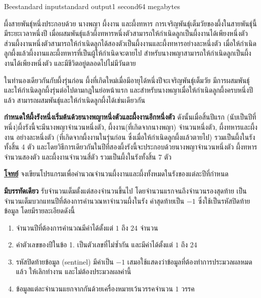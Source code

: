 \documentclass[11pt,a4paper]{article}
\begin{document}
\begin{problem}{Bee}{standard input}{standard output}{1 second}{64 megabytes}

ผึ้งสายพันธุ์หนึ่งประกอบด้วย นางพญา ผึ้งงาน และผึ้งทหาร การเจริญพันธุ์เต็มวัยของผึ้งในสายพันธุ์นี้ มีระยะเวลาหนึ่งปี เมื่อผสมพันธุ์แล้วผึ้งทหารหนึ่งตัวสามารถให้กำเนิดลูกเป็นผึ้งงานได้เพียงหนึ่งตัว ส่วนผึ้งงานหนึ่งตัวสามารถให้กำเนิดลูกได้สองตัวเป็นผึ้งงานและผึ้งทหารอย่างละหนึ่งตัว เมื่อให้กำเนิดลูกผึ้งแล้วผึ้งงานและผึ้งทหารที่เป็นผู้ให้กำเนิดจะตายไป สำหรับนางพญาสามารถให้กำเนิดลูกเป็นผึ้งงานได้เพียงหนึ่งตัว และมีชีวิตอยู่ตลอดไปไม่มีวันตาย

ในทำนองเดียวกันกับผึ้งรุ่นก่อน ผึ้งที่เกิดใหม่เมื่อมีอายุได้หนึ่งปีจะเจริญพันธุ์เต็มวัย มีการผสมพันธุ์ และให้กำเนิดลูกผึ้งรุ่นต่อไปตามกฎในย่อหน้าแรก และสำหรับนางพญาเมื่อให้กำเนิดลูกผึ้งครบหนึ่งปีแล้ว สามารถผสมพันธุ์และให้กำเนิดลูกผึ้งได้เช่นเดียวกัน

\textbf{กำหนดให้ผึ้งรังหนึ่งเริ่มต้นด้วยนางพญาหนึ่งตัวและผึ้งงานอีกหนึ่งตัว} ดังนั้นเมื่อสิ้นปีแรก (นับเป็นปีที่หนึ่ง)ผึ้งรังนี้จะมีนางพญาจำนวนหนึ่งตัว, ผึ้งงาน(ที่เกิดจากนางพญา) จำนวนหนึ่งตัว, ผึ้งทหารและผึ้งงาน อย่างละหนึ่งตัว (ที่เกิดจากผึ้งงานในรุ่นก่อน ซึ่งเมื่อให้กำเนิดลูกผึ้งแล้วตายไป) รวมเป็นผึ้งในรังทั้งสิ้น 4 ตัว และโดยวิธีการเดียวกันในปีที่สองผึ้งรังนี้จะประกอบด้วยนางพญาจำนวนหนึ่งตัว ผึ้งทหารจำนวนสองตัว และผึ้งงานจำนวนสี่ตัว รวมเป็นผึ้งในรังทั้งสิ้น 7 ตัว


\underline{\textbf{โจทย์}} จงเขียนโปรแกรมเพื่อคำนวณจำนวนผึ้งงานและผึ้งทั้งหมดในรังของแต่ละปีที่กำหนด

\InputFile

\textbf{มีบรรทัดเดียว} รับจำนวนเต็มตั้งแต่สองจำนวนขึ้นไป โดยจำนวนแรกจนถึงจำนวนรองสุดท้าย เป็นจำนวนเต็มบวกแทนปีที่ต้องการคำนวณหาจำนวนผึ้งในรัง ค่าสุดท้ายเป็น $-1$ ซึ่งใช้เป็นรหัสปิดท้ายข้อมูล โดยมีรายละเอียดดังนี้
\begin{enumerate}

\item จำนวนปีที่ต้องการคำนวณมีค่าได้ตั้งแต่ $1$ ถึง $24$ จำนวน
\item ค่าตัวเลขของปีในข้อ 1. เป็นตัวเลขที่ไม่ซ้ำกัน และมีค่าได้ตั้งแต่ $1$ ถึง $24$
\item รหัสปิดท้ายข้อมูล (sentinel) มีค่าเป็น $-1$ เสมอใช้แสดงว่าข้อมูลที่ต้องทำการประมวลผลหมดแล้ว ให้เลิกทำงาน และไม่ต้องประมวลผลค่านี้
\item ข้อมูลแต่ละจำนวนแยกจากกันด้วยเครื่องหมายเว้นวรรคจำนวน $1$ วรรค
\end{enumerate}

\OutputFile


\end{problem}
\end{document}

